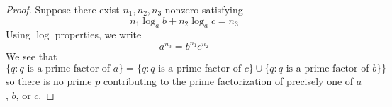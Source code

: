 \documentclass[12pt, reqno]{amsart}
\theoremstyle{definition}
\theoremstyle{remark}
\begin{document}
\begin{itemize}
\begin{proof}
    Suppose there exist $n_{1},n_{2},n_{3}$ nonzero satisfying $$n_{1}\log_{a}b+n_{2}\log_{a}c=n_{3}$$Using $\log$ properties, we write $$a^{n_{3}}=b^{n_{1}}c^{n_{2}}$$We see that $$\{q:q\text{ is a prime factor of }a\}=\{q:q\text{ is a prime factor of }c\}\cup\{q:q\text{ is a prime factor of }b\}\}$$so there is no prime $p$ contributing to the prime factorization of precisely one of $a$, $b$, or $c$.    
\end{proof}



\end{itemize}
\end{document}
